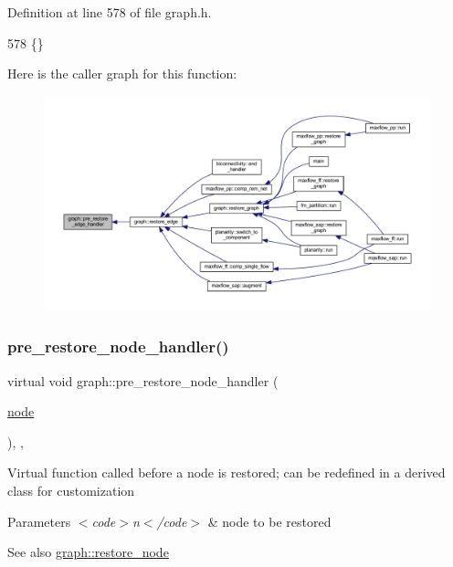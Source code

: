 Definition at line 578 of file graph.\+h.


\begin{DoxyCode}
578 \{\}       
\end{DoxyCode}
Here is the caller graph for this function\+:
\nopagebreak
\begin{figure}[H]
\begin{center}
\leavevmode
\includegraphics[width=350pt]{classgraph_a569d227d9f4914278a143d52139e3303_icgraph}
\end{center}
\end{figure}
\mbox{\label{classgraph_a3a305d240ab5237a2adae315b50105a6}} 
\subsubsection{\texorpdfstring{pre\+\_\+restore\+\_\+node\+\_\+handler()}{pre\_restore\_node\_handler()}}
{\footnotesize\ttfamily virtual void graph\+::pre\+\_\+restore\+\_\+node\+\_\+handler (\begin{DoxyParamCaption}\item[{\mbox{\hyperlink{classnode}{node}}}]{ }\end{DoxyParamCaption})\hspace{0.3cm}{\ttfamily [inline]}, {\ttfamily [virtual]}, {\ttfamily [inherited]}}

Virtual function called before a node is restored; can be redefined in a derived class for customization


\begin{DoxyParams}{Parameters}
{\em $<$code$>$n$<$/code$>$} & node to be restored \\
\hline
\end{DoxyParams}
\begin{DoxySeeAlso}{See also}
\mbox{\hyperlink{classgraph_ab57aab79e649cc275052b7decbdd03ec}{graph\+::restore\+\_\+node}} 
\end{DoxySeeAlso}


